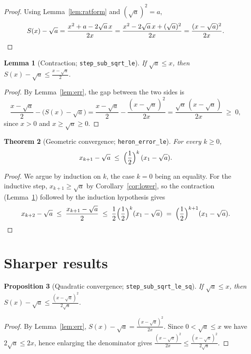 \documentclass[11pt]{article}
\theoremstyle{plain}
\newtheorem{theorem}{Theorem}[section]
\newtheorem{lemma}[theorem]{Lemma}
\newtheorem{proposition}[theorem]{Proposition}
\theoremstyle{definition}
\theoremstyle{remark}
\begin{document}
\begin{proof}
Using Lemma~\ref{lem:ratform} and $(\sqrt{a})^2=a$,
\[
  S(x)-\sqrt{a}=\frac{x^2+a-2\sqrt{a}\,x}{2x}
              =\frac{x^2-2\sqrt{a}\,x+(\sqrt{a})^2}{2x}
              =\frac{(x-\sqrt{a})^2}{2x}. \qedhere
\]
\end{proof}

\begin{lemma}[Contraction; \texttt{step\_sub\_sqrt\_le}]\label{lem:contr}
If $\sqrt{a}\leq x$, then $\displaystyle S(x)-\sqrt{a}\leq\frac{x-\sqrt{a}}{2}.$
\end{lemma}

\begin{proof}
By Lemma~\ref{lem:err}, the gap between the two sides is
\[
  \frac{x-\sqrt{a}}{2}-\big(S(x)-\sqrt{a}\big)
   =\frac{x-\sqrt{a}}{2}-\frac{(x-\sqrt{a})^2}{2x}
   =\frac{\sqrt{a}\,(x-\sqrt{a})}{2x}\;\geq\;0,
\]
since $x>0$ and $x\geq\sqrt{a}\geq 0$.
\end{proof}

\begin{theorem}[Geometric convergence; \texttt{heron\_error\_le}]\label{thm:geom}
For every $k\geq 0$,
\[
  x_{k+1}-\sqrt{a}\;\leq\;\Bigl(\frac{1}{2}\Bigr)^k\,(x_1-\sqrt{a}).
\]
\end{theorem}

\begin{proof}
We argue by induction on $k$, the case $k=0$ being an equality. For the inductive step,
$x_{k+1}\geq\sqrt{a}$ by Corollary~\ref{cor:lower}, so the contraction
(Lemma~\ref{lem:contr}) followed by the induction hypothesis gives
\[
  x_{k+2}-\sqrt{a}\;\leq\;\frac{x_{k+1}-\sqrt{a}}{2}
   \;\leq\;\frac12\Big(\frac{1}{2}\Big)^k(x_1-\sqrt{a})
   \;=\;\Big(\frac{1}{2}\Big)^{k+1}(x_1-\sqrt{a}). \qedhere
\]
\end{proof}

\section{Sharper results}

\begin{proposition}[Quadratic convergence; \texttt{step\_sub\_sqrt\_le\_sq}]\label{prop:quad}
If $\sqrt{a}\leq x$, then $\displaystyle S(x)-\sqrt{a}\leq\frac{(x-\sqrt{a})^2}{2\sqrt{a}}.$
\end{proposition}

\begin{proof}
By Lemma~\ref{lem:err}, $S(x)-\sqrt{a}=\frac{(x-\sqrt{a})^2}{2x}$. Since $0<\sqrt{a}\leq x$ we
have $2\sqrt{a}\leq 2x$, hence enlarging the denominator gives
$\frac{(x-\sqrt{a})^2}{2x}\leq\frac{(x-\sqrt{a})^2}{2\sqrt{a}}$.
\end{proof}
\end{document}
